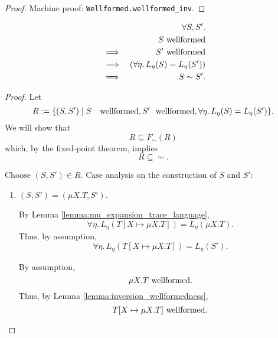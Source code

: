 \documentclass{llncs}
\newcommand*{\sequiv}{\sim}
\newcommand*{\wf}[1]{\text{$#1$ {\normalfont \rmfamily wellformed}}}
\renewcommand*{\|}{\;|\;}
\newcommand*{\machproofc}[1]{Machine proof: \code{#1}.}
\newcommand*{\code}[1]{\texttt{#1}}
\begin{document}
\begin{proof}
  \machproofc{Wellformed.wellformed\_inv}
\end{proof}


\begin{theorem}
  \label{th:equality_equivalence}
  \begin{eqnarray*}
    &&         \forall S, S'. \\
    &&         \wf{S} \\
    &\implies& \wf{S'} \\
    &\implies& (\forall \eta.\, L_\eta(S) = L_\eta(S')) \\
    &\implies& S \sequiv S'.
  \end{eqnarray*}
\end{theorem}

\begin{proof}
  Let
  \begin{equation*}
    R := \{(S, S') \| \wf{S}, \wf{S'}, \forall \eta.\, L_\eta(S) = L_\eta(S') \}.
  \end{equation*}
  We will show that
  \begin{equation*}
    R \subseteq F_\sequiv(R)
  \end{equation*}
  which, by the fixed-point theorem, implies
  \begin{equation*}
    R \subseteq \sequiv.
  \end{equation*}

  Choose $(S, S') \in R$.
  Case analysis on the construction of $S$ and $S'$:
  \begin{enumerate}
    \item
      \label{case:equality_equivalence:mu1}
      $(S, S') = (\mu X.T, S')$.

      By Lemma \ref{lemma:mu_expansion_trace_language},
      \begin{equation*}
        \forall \eta.\, L_\eta(T[X \mapsto \mu X.T]) = L_\eta(\mu X.T).
      \end{equation*}
      Thus, by assumption,
      \begin{equation}
        \label{eq:equality_equivalence:1:mu1:ls}
        \forall \eta.\, L_\eta(T[X \mapsto \mu X.T]) = L_\eta(S').
      \end{equation}

      By assumption,
      \begin{equation*}
        \wf{\mu X.T}.
      \end{equation*}
      Thus, by Lemma \ref{lemma:inversion_wellformedness},
      \begin{equation}
        \label{eq:equality_equivalence:1:mu1:wf}
        \wf{T[X \mapsto \mu X.T]}.
      \end{equation}


\end{enumerate}
\end{proof}
\end{document}
